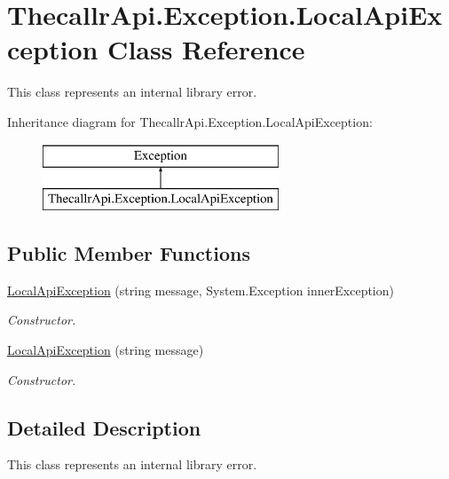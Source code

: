 \hypertarget{class_thecallr_api_1_1_exception_1_1_local_api_exception}{\section{Thecallr\+Api.\+Exception.\+Local\+Api\+Exception Class Reference}
\label{class_thecallr_api_1_1_exception_1_1_local_api_exception}
}


This class represents an internal library error.  


Inheritance diagram for Thecallr\+Api.\+Exception.\+Local\+Api\+Exception\+:\begin{figure}[H]
\begin{center}
\leavevmode
\includegraphics[height=2.000000cm]{class_thecallr_api_1_1_exception_1_1_local_api_exception}
\end{center}
\end{figure}
\subsection*{Public Member Functions}
\begin{DoxyCompactItemize}
\item 
\hyperlink{class_thecallr_api_1_1_exception_1_1_local_api_exception_a52d746b68d7ec64f280d9775c4499340}{Local\+Api\+Exception} (string message, System.\+Exception inner\+Exception)
\begin{DoxyCompactList}\small\item\em Constructor. \end{DoxyCompactList}\item 
\hyperlink{class_thecallr_api_1_1_exception_1_1_local_api_exception_ac7b33f253c30ef0900bb83e46e29c8d8}{Local\+Api\+Exception} (string message)
\begin{DoxyCompactList}\small\item\em Constructor. \end{DoxyCompactList}\end{DoxyCompactItemize}


\subsection{Detailed Description}
This class represents an internal library error. 



